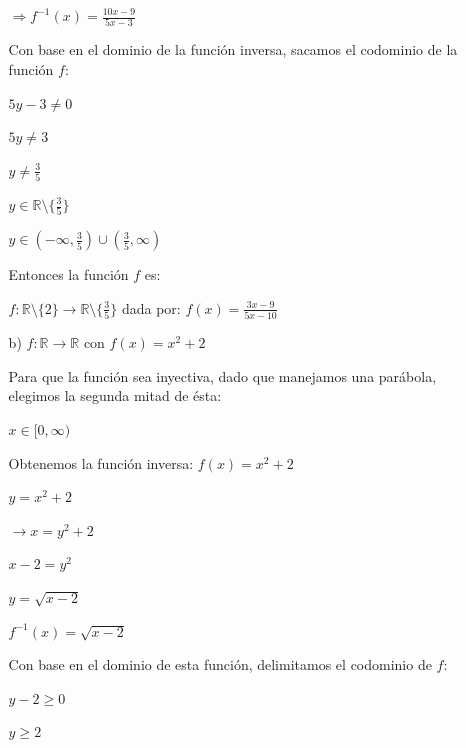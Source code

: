 \documentclass{article}
\begin{document}
\begin{enumerate}
\begin{enumerate}
        \(\Rightarrow f^{-1}(x) = \frac{10x - 9}{5x - 3}\)
        \vspace{\baselineskip}
        
        Con base en el dominio de la función inversa, sacamos el codominio de la función \(f\):
        
        \(5y - 3 \neq 0\)
        
        \(5y \neq 3\)
        
        \(y \neq \frac{3}{5}\)
        
        \(y \in \mathbb{R} \setminus \{\frac{3}{5}\}\)
        
        \(y \in (-\infty, \frac{3}{5}) \cup (\frac{3}{5}, \infty)\)
        \vspace{\baselineskip}
        
        Entonces la función \(f\) es:
        
        \(f : \mathbb{R} \setminus \{2\} \rightarrow \mathbb{R} \setminus \{\frac{3}{5}\}\) dada por: \(f(x) = \frac{3x - 9}{5x - 10}\)
        \vspace{\baselineskip}
        
        \item[b)] \(f : \mathbb{R} \rightarrow \mathbb{R} \text{ con } f(x) = x^2 + 2\)

        Para que la función sea inyectiva, dado que manejamos una parábola, elegimos la segunda mitad de ésta:
        
        \(x \in [0, \infty)\)
        \vspace{\baselineskip}
        
        Obtenemos la función inversa:
        \(f(x) = x^2 + 2\)
        
        \(y = x^2 + 2\)
        \vspace{\baselineskip}
        
        \(\rightarrow x = y^2 + 2\)
        
        \(x - 2 = y^2\)
        
        \(y = \sqrt{x - 2}\)
        \vspace{\baselineskip}
        
        \(f^{-1}(x) = \sqrt{x - 2}\)
        \vspace{\baselineskip}
        
        Con base en el dominio de esta función, delimitamos el codominio de \(f\):
        
        \(y - 2 \geq 0\)
        
        \(y \geq 2\)
        

\end{enumerate}
\end{enumerate}
\end{document}
